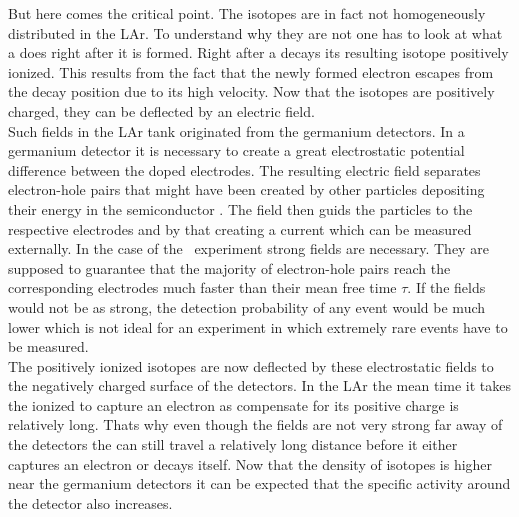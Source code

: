 \documentclass[encoding=utf8,british]{tumphthesis}
\begin{document}
But here comes the critical point.
The  isotopes are in fact not homogeneously distributed in the LAr.
To understand why they are not one has to look at what a  does right after it is formed.
Right after a  decays its resulting  isotope positively ionized.
This results from the fact that the newly formed electron escapes from the decay position due to its high velocity.
Now that the  isotopes are positively charged, they can be deflected by an electric field.
\\

Such fields in the LAr tank originated from the germanium detectors.
In a germanium detector it is necessary to create a great electrostatic potential difference between the doped electrodes.
The resulting electric field separates electron-hole pairs that might have been created by other particles depositing their energy in the semiconductor \cite{spieler_semiconductor_2005}.
The field then guids the particles to the respective electrodes and by that creating a current which can be measured externally.
In the case of the \gerda\ experiment strong fields are necessary.
They are supposed to guarantee that the majority of electron-hole pairs reach the corresponding electrodes much faster than their mean free time $\tau$. %
If the fields would not be as strong, the detection probability of any event would be much lower which is not ideal for an experiment in which extremely rare events have to be measured.
\\

The positively ionized isotopes are now deflected by these electrostatic fields to the negatively charged surface of the detectors. 
In the LAr the mean time it takes the ionized  to capture an electron as compensate for its positive charge is relatively long. 
Thats why even though the fields are not very strong far away of the detectors the  can still travel a relatively long distance before it either captures an electron or decays itself. 
Now that the density of  isotopes is higher near the germanium detectors it can be expected that the specific activity around the detector also increases.
\\
\end{document}
